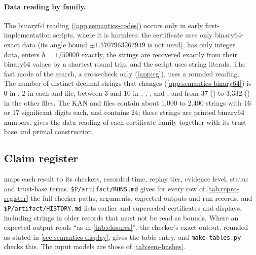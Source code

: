\paragraph{Data reading by family.}
The binary64 reading (\cref{app:semantics-codes}) occurs only in early first-implementation scripts, where it is harmless: the  certificate uses only binary64-exact data (its angle bound $\pm1.5707963267949$ is not used),  has only integer data,  enters $h=1/50000$ exactly, the  strings are recovered exactly from their binary64 values by a shortest round trip, and the  script uses string literals.
The fast mode of the  search, a cross-check only (\cref{app:eg}), uses a rounded reading.
The number of distinct decimal strings that  changes (\cref{app:semantics-binary64}) is 0 in , 2 in each  and  file, between 3 and 10 in , , ,  and , and from 37 () to 3,332 () in the other files.
The KAN and  files contain about 1,000 to 2,400 strings with 16 or 17 significant digits each, and  contains 24; these strings are printed binary64 numbers.
 gives the data reading of each certificate family together with its trust base and primal construction.

\subsection{Claim register}\label{app:repro-register}

 maps each result to its checkers, recorded time, replay tier, evidence level, status and trust-base terms.
\nolinkurl{$P/artifact/RUNS.md} gives for every row of \cref{tab:repro-register} the full checker paths, arguments, expected outputs and run records, and \nolinkurl{$P/artifact/HISTORY.md} lists earlier and superseded certificates and displays, including strings in older records that must not be read as bounds.
Where an expected output reads ``as in \cref{tab:closures}'', the checker's exact output, rounded as stated in \cref{sec:semantics-display}, gives the table entry, and \nolinkurl{make_tables.py} checks this.
The input models are those of \cref{tab:sem-hashes}.

